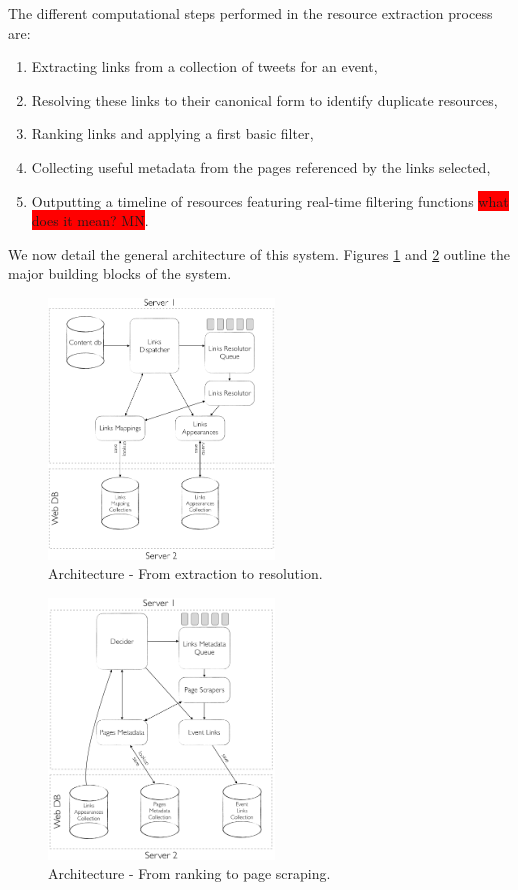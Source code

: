 \documentclass{sig-alternate}
\newcommand{\todo}[1]{\colorbox{red}{#1}}
\begin{document}

The different computational steps performed in the resource extraction process are:
\begin{enumerate}
 \item Extracting links from a collection of tweets for an event,
 \item Resolving these links to their canonical form to identify duplicate resources,
 \item Ranking links and applying a first basic filter,
 \item Collecting useful metadata from the pages referenced by the links selected,
 \item Outputting a timeline of resources featuring real-time filtering functions \todo{what does it mean? MN}.
\end{enumerate}

We now detail the general architecture of this system. Figures \ref{fig:architecture_resolution} and \ref{fig:architecture_metadata} outline the major building blocks of the system.
\begin{figure}[htbp]
  \centering
  \includegraphics[width=6cm]{Figures/links_processing_architecture_resolution.png}
  \caption{Architecture - From extraction to resolution.}
  \label{fig:architecture_resolution}
\end{figure}
\begin{figure}[htbp]
  \centering
  \includegraphics[width=6cm]{Figures/links_processing_architecture_metadata.png}
  \caption{Architecture - From ranking to page scraping.}
  \label{fig:architecture_metadata}
\end{figure}
\end{document}
